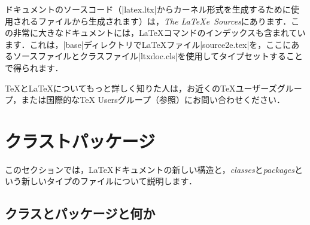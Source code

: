 \documentclass{ltxguide}[2001/05/28]
\begin{document}
ドキュメントのソースコード（|latex.ltx|からカーネル形式を生成するために使用されるファイルから生成されます）は，\emph{The LaTeXe\ Sources}にあります．この非常に大きなドキュメントには，\LaTeX{}コマンドのインデックスも含まれています．これは，|base|ディレクトリで\LaTeX{}ファイル|source2e.tex|を，ここにあるソースファイルとクラスファイル|ltxdoc.cls|を使用してタイプセットすることで得られます．

\TeX{}と\LaTeX{}についてもっと詳しく知りた人は，お近くの\TeX{}ユーザーズグループ，または国際的な\TeX{} Usersグループ（\pageref {addrs}参照）にお問い合わせください．

\section{クラストパッケージ}
\label{Sec:class+packages}

このセクションでは，\LaTeX{}ドキュメントの新しい構造と，\emph{classes}と\emph{packages}という新しいタイプのファイルについて説明します．

\subsection{クラスとパッケージと何か}
\end{document}
